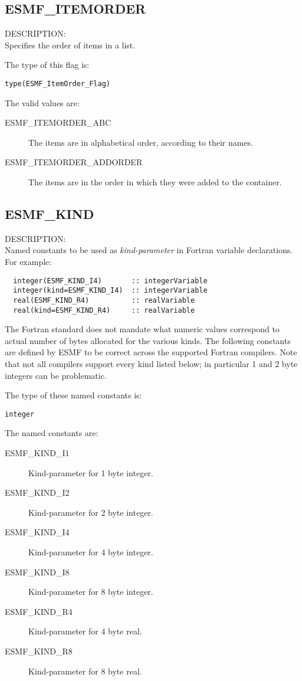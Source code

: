 \subsection{ESMF\_ITEMORDER}
\label{const:itemorderflag}
{\sf DESCRIPTION:\\}  
Specifies the order of items in a list.

The type of this flag is:

{\tt type(ESMF\_ItemOrder\_Flag)}

The valid values are:
\begin{description}

\item [ESMF\_ITEMORDER\_ABC]
         The items are in alphabetical order, according to their names.
\item [ESMF\_ITEMORDER\_ADDORDER]
         The items are in the order in which they were added to the container.
\end{description}


\subsection{ESMF\_KIND}
\label{const:kind}

{\sf DESCRIPTION:\\}
Named constants to be used as {\em kind-parameter} in Fortran variable
declarations. For example:
\begin{verbatim}
  integer(ESMF_KIND_I4)       :: integerVariable
  integer(kind=ESMF_KIND_I4)  :: integerVariable
  real(ESMF_KIND_R4)          :: realVariable
  real(kind=ESMF_KIND_R4)     :: realVariable
\end{verbatim}
The Fortran standard does not mandate what numeric values correspond to
actual number of bytes allocated for the various kinds. The following constants
are defined by ESMF to be correct across the supported Fortran compilers.
Note that not all compilers support every kind listed below; in particular
1 and 2 byte integers can be problematic.

The type of these named constants is:

{\tt integer}

The named constants are:
\begin{description}
\item [ESMF\_KIND\_I1]
      Kind-parameter for 1 byte integer.
\item [ESMF\_KIND\_I2]
      Kind-parameter for 2 byte integer.
\item [ESMF\_KIND\_I4]
      Kind-parameter for 4 byte integer.
\item [ESMF\_KIND\_I8]
      Kind-parameter for 8 byte integer.
\item [ESMF\_KIND\_R4]
      Kind-parameter for 4 byte real.
\item [ESMF\_KIND\_R8]
      Kind-parameter for 8 byte real.
\end{description}


